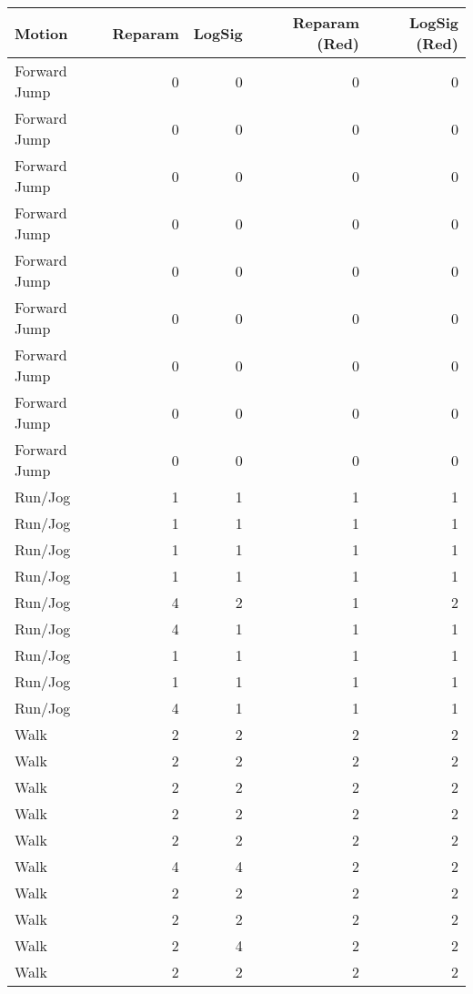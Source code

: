 \begin{tabular}{lrrrr}
\toprule
Motion & Reparam & LogSig & Reparam (Red) & LogSig (Red) \\
\midrule
Forward Jump & 0 & 0 & 0 & 0 \\
Forward Jump & 0 & 0 & 0 & 0 \\
Forward Jump & 0 & 0 & 0 & 0 \\
Forward Jump & 0 & 0 & 0 & 0 \\
Forward Jump & 0 & 0 & 0 & 0 \\
Forward Jump & 0 & 0 & 0 & 0 \\
Forward Jump & 0 & 0 & 0 & 0 \\
Forward Jump & 0 & 0 & 0 & 0 \\
Forward Jump & 0 & 0 & 0 & 0 \\
Run/Jog & 1 & 1 & 1 & 1 \\
Run/Jog & 1 & 1 & 1 & 1 \\
Run/Jog & 1 & 1 & 1 & 1 \\
Run/Jog & 1 & 1 & 1 & 1 \\
Run/Jog & 4 & 2 & 1 & 2 \\
Run/Jog & 4 & 1 & 1 & 1 \\
Run/Jog & 1 & 1 & 1 & 1 \\
Run/Jog & 1 & 1 & 1 & 1 \\
Run/Jog & 4 & 1 & 1 & 1 \\
Walk & 2 & 2 & 2 & 2 \\
Walk & 2 & 2 & 2 & 2 \\
Walk & 2 & 2 & 2 & 2 \\
Walk & 2 & 2 & 2 & 2 \\
Walk & 2 & 2 & 2 & 2 \\
Walk & 4 & 4 & 2 & 2 \\
Walk & 2 & 2 & 2 & 2 \\
Walk & 2 & 2 & 2 & 2 \\
Walk & 2 & 4 & 2 & 2 \\
Walk & 2 & 2 & 2 & 2 \\
\bottomrule
\end{tabular}
